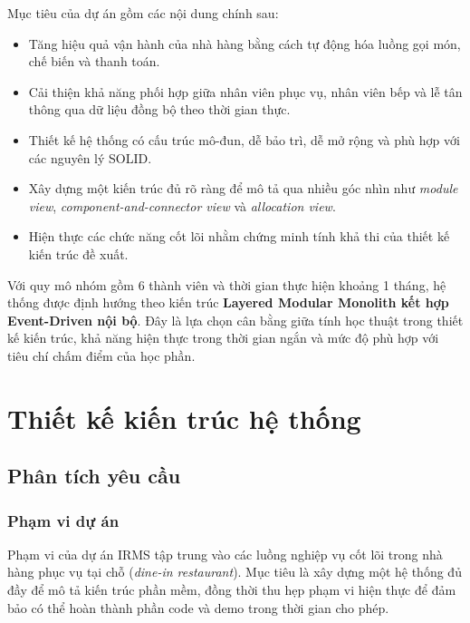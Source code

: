 \documentclass[12pt,a4paper]{article}
\begin{document}
Mục tiêu của dự án gồm các nội dung chính sau:
\begin{itemize}
    \item Tăng hiệu quả vận hành của nhà hàng bằng cách tự động hóa luồng gọi món, chế biến và thanh toán.
    \item Cải thiện khả năng phối hợp giữa nhân viên phục vụ, nhân viên bếp và lễ tân thông qua dữ liệu đồng bộ theo thời gian thực.
    \item Thiết kế hệ thống có cấu trúc mô-đun, dễ bảo trì, dễ mở rộng và phù hợp với các nguyên lý SOLID.
    \item Xây dựng một kiến trúc đủ rõ ràng để mô tả qua nhiều góc nhìn như \textit{module view}, \textit{component-and-connector view} và \textit{allocation view}.
    \item Hiện thực các chức năng cốt lõi nhằm chứng minh tính khả thi của thiết kế kiến trúc đề xuất.
\end{itemize}

Với quy mô nhóm gồm 6 thành viên và thời gian thực hiện khoảng 1 tháng, hệ thống được định hướng theo kiến trúc \textbf{Layered Modular Monolith kết hợp Event-Driven nội bộ}. Đây là lựa chọn cân bằng giữa tính học thuật trong thiết kế kiến trúc, khả năng hiện thực trong thời gian ngắn và mức độ phù hợp với tiêu chí chấm điểm của học phần.

\section{Thiết kế kiến trúc hệ thống}

\subsection{Phân tích yêu cầu}

\subsubsection{Phạm vi dự án}

Phạm vi của dự án IRMS tập trung vào các luồng nghiệp vụ cốt lõi trong nhà hàng phục vụ tại chỗ (\textit{dine-in restaurant}). Mục tiêu là xây dựng một hệ thống đủ đầy để mô tả kiến trúc phần mềm, đồng thời thu hẹp phạm vi hiện thực để đảm bảo có thể hoàn thành phần code và demo trong thời gian cho phép.
\end{document}
